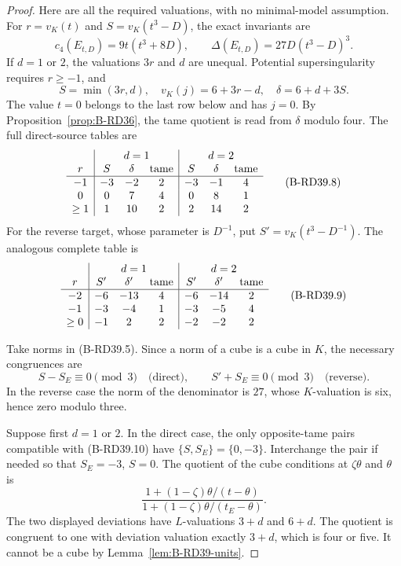 \begin{proof}
Here are all the required valuations, with no minimal-model
assumption. For $r=v_K(t)$ and $S=v_K(t^3-D)$, the exact invariants are
\[
 c_4(E_{t,D})=9t(t^3+8D),\qquad
 \Delta(E_{t,D})=27D(t^3-D)^3.
                                                        \tag{B-RD39.6}
\]
If $d=1$ or $2$, the valuations $3r$ and $d$ are unequal.
Potential supersingularity requires $r\ge-1$, and
\[
             S=\min(3r,d),\quad
             v_K(j)=6+3r-d,\quad
             \delta=6+d+3S.
                                                        \tag{B-RD39.7}
\]
The value $t=0$ belongs to the last row below and has $j=0$.
By Proposition~\ref{prop:B-RD36}, the tame quotient is read from
$\delta$ modulo four. The full direct-source tables are
\[
\begin{array}{c|ccc|ccc}
 &\multicolumn{3}{c|}{d=1}&\multicolumn{3}{c}{d=2}\\
r&S&\delta&\text{tame}&S&\delta&\text{tame}\\\hline
-1&-3&-2&2&-3&-1&4\\
0&0&7&4&0&8&1\\
\ge1&1&10&2&2&14&2
\end{array}                                             \tag{B-RD39.8}
\]
For the reverse target, whose parameter is $D^{-1}$, put
$S'=v_K(t^3-D^{-1})$. The analogous complete table is
\[
\begin{array}{c|ccc|ccc}
 &\multicolumn{3}{c|}{d=1}&\multicolumn{3}{c}{d=2}\\
r&S'&\delta'&\text{tame}&S'&\delta'&\text{tame}\\\hline
-2&-6&-13&4&-6&-14&2\\
-1&-3&-4&1&-3&-5&4\\
\ge0&-1&2&2&-2&-2&2
\end{array}                                             \tag{B-RD39.9}
\]

Take norms in (B-RD39.5). Since a norm of a cube is a cube in $K$,
the necessary congruences are
\[
    S-S_E\equiv0\pmod3\quad\text{(direct)},\qquad
    S'+S_E\equiv0\pmod3\quad\text{(reverse)}.
                                                        \tag{B-RD39.10}
\]
In the reverse case the norm of the denominator is $27$, whose
$K$-valuation is six, hence zero modulo three.

Suppose first $d=1$ or $2$. In the direct case, the only
opposite-tame pairs compatible with (B-RD39.10) have
$\{S,S_E\}=\{0,-3\}$. Interchange the pair if needed so that
$S_E=-3$, $S=0$. The quotient of the cube conditions at
$\zeta\theta$ and $\theta$ is
\[
 \frac{1+(1-\zeta)\theta/(t-\theta)}
      {1+(1-\zeta)\theta/(t_E-\theta)}.
                                                        \tag{B-RD39.11}
\]
The two displayed deviations have $L$-valuations $3+d$ and $6+d$.
The quotient is congruent to one with deviation valuation exactly
$3+d$, which is four or five. It cannot be a cube by
Lemma~\ref{lem:B-RD39-units}.


\end{proof}

